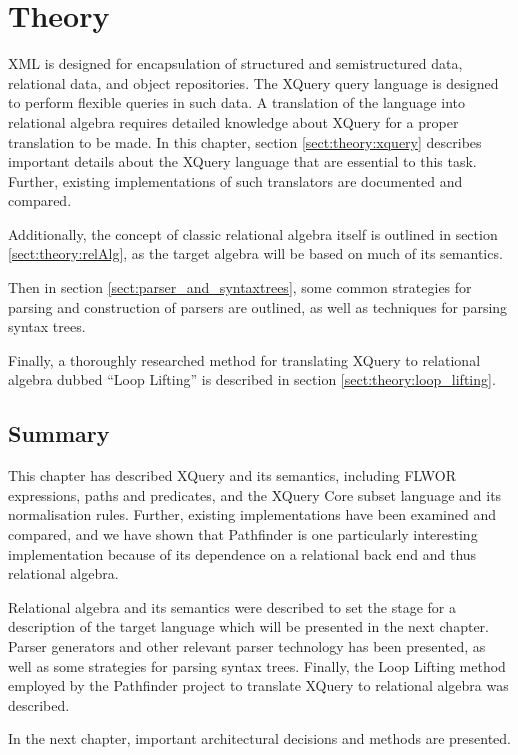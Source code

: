 \chapter{Theory}
\label{chapter:theory}
XML is designed for encapsulation of structured and semistructured data,
relational data, and object repositories. The XQuery query language is designed
to perform flexible queries in such data. A translation of the language into
relational algebra requires detailed knowledge about XQuery for a proper translation to be made. In this chapter, section
\ref{sect:theory:xquery} describes important details about the XQuery
language that are essential to this task. Further, existing implementations of
such translators are documented and compared.

Additionally, the concept of classic relational algebra itself is outlined in
section \ref{sect:theory:relAlg}, as the target algebra will be based on much
of its semantics.

Then in section \ref{sect:parser_and_syntaxtrees}, some common strategies for
parsing and construction of parsers are outlined, as well as techniques for
parsing syntax trees.

Finally, a thoroughly researched method for translating XQuery to relational
algebra dubbed ``Loop Lifting'' is described in section \ref{sect:theory:loop_lifting}.







\section{Summary}
\label{sect:theory:summary}
This chapter has described XQuery and its semantics, including FLWOR
expressions, paths and predicates, and the XQuery Core subset language and its
normalisation rules. Further, existing implementations have been examined and
compared, and we have shown that Pathfinder is one particularly interesting
implementation because of its dependence on a relational back end and thus
relational algebra.

Relational algebra and its semantics were described to set the stage for a
description of the target language which will be presented in the next chapter.
Parser generators and other relevant parser technology has been presented, as
well as some strategies for parsing syntax trees. Finally, the Loop Lifting
method employed by the Pathfinder project to translate XQuery to relational
algebra was described.

In the next chapter, important architectural decisions and methods are
presented.